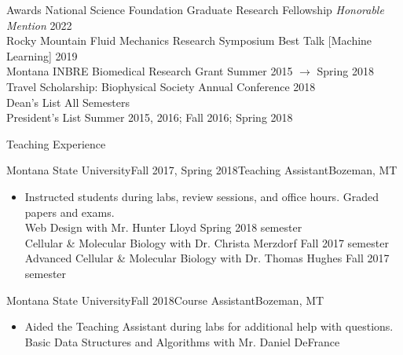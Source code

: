 \documentclass{resume} %
\begin{document}
\fi
\iftrue
\begin{rSection}{Awards}
\noindent National Science Foundation Graduate Research Fellowship {\it Honorable Mention} \hfill 2022\\
Rocky Mountain Fluid Mechanics Research Symposium Best Talk [Machine Learning] \hfill 2019 \\
Montana INBRE Biomedical Research Grant
\hfill Summer 2015 $\to$ Spring 2018\\
Travel Scholarship: Biophysical Society Annual Conference \hfill 2018\\
Dean's List \hfill All Semesters\\
President's List \hfill Summer 2015, 2016; Fall 2016; Spring 2018
\end{rSection}
\fi
\iftrue
\begin{rSection}{Teaching Experience }
\begin{rSubsection}{Montana State University}{Fall 2017, Spring 2018}{Teaching Assistant}{Bozeman, MT}
\begin{itemize}
\setlength \itemsep{-0.4em}
    \item Instructed students during labs, review sessions, and office hours. Graded papers and exams.
\\\hspace*{5mm} Web Design with Mr. Hunter Lloyd \hfill{Spring 2018 semester}
\\\hspace*{5mm} Cellular \& Molecular Biology with Dr. Christa Merzdorf \hfill{Fall 2017 semester}
\\\hspace*{5mm} Advanced Cellular \& Molecular Biology with Dr. Thomas Hughes \hfill{Fall 2017 semester}

\end{itemize}
\end{rSubsection}
\begin{rSubsection}{Montana State University}{Fall 2018}{Course Assistant}{Bozeman, MT}
\begin{itemize}
\setlength \itemsep{-0.4em}
    \item Aided the Teaching Assistant during labs for additional help with questions.
\\\hspace*{5mm} Basic Data Structures and Algorithms with Mr. Daniel DeFrance

\end{itemize}
\end{rSubsection}
\end{rSection}
\end{document}

